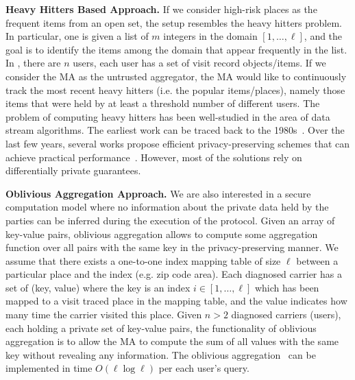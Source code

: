 \textbf{Heavy Hitters Based Approach.} If we consider high-risk places as the frequent items from an open set, the setup resembles the heavy hitters problem. In particular, one is given a list of $m$ integers in the domain $[1, \ldots, \ell]$, and the goal is to identify the items among the domain that appear frequently in the list. In \sysname, there are $n$ users, each user has a set of visit record objects/items. If we consider the MA as the untrusted aggregator, the MA would like to continuously track the most recent heavy hitters (i.e. the popular items/places), namely those items that were held by at least a threshold number of different users. %
The problem of computing heavy hitters has been well-studied in the area of data stream algorithms. The earliest work can be traced back to the 1980s~\cite{BoyerHeavyhitter81}. Over the last few years, several works propose  efficient privacy-preserving schemes that can achieve practical performance~\cite{BassilyNeurIPs17}. However, most of the solutions rely on  differentially private guarantees. 

\textbf{Oblivious Aggregation Approach.} We are also interested in a secure computation model where no information about the private data held by the parties can be inferred during the execution of the protocol.  Given an array of key-value pairs, oblivious aggregation allows to compute some aggregation function over all pairs with the same key in the privacy-preserving manner. %
We assume that there exists a one-to-one index mapping table of size $\ell$ between a particular place and the index (e.g. zip code area). Each diagnosed carrier has a set of (key, value) where the key is an index $i \in [1, \ldots, \ell]$ which has been mapped to a visit traced place in the mapping table, and the value indicates how many time the carrier visited this place. Given $n>2$ diagnosed carriers (users), each holding a private set of key-value pairs, the functionality of oblivious aggregation is to allow the MA to compute the sum of all values with the same key without revealing any information. The oblivious aggregation~\cite{Boyle2016, SOda19} can be implemented in time $O(\ell \log \ell)$ per each user's query. %


